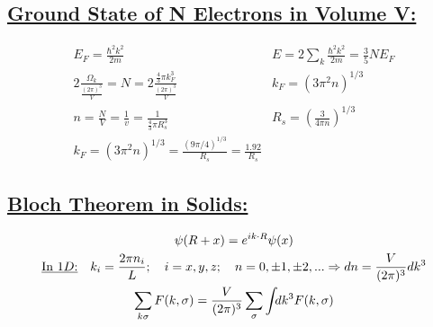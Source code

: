 \documentclass[a4paper,12pt]{article}
\begin{document}
\subsection*{\underline{Ground State of N Electrons in Volume V:}}

\begin{align}
&E_F=\frac{\hbar^2k^2}{2m}
&E=2\sum_k\frac{\hbar^2k^2}{2m}=\frac{3}{5}NE_F
&\\
&2\frac{\Omega_k}{\frac{(2\pi)^3}{V}}=N=2\frac{\frac{4}{3}\pi k_F^3}{\frac{(2\pi)^3}{V}}
& k_F = (3\pi^2n)^{1/3}
&\\
&n=\frac{N}{V}=\frac{1}{v}=\frac{1}{\frac{4}{3}\pi R_s^3}
&R_s=\left(\frac{3}{4\pi n}\right)^{1/3}
&\\
& k_F = (3\pi^2n)^{1/3} = \frac{(9\pi /4)^{1/3}}{R_s}=\frac{1.92}{R_s}
\end{align}
\subsection*{\underline{Bloch Theorem in Solids:}}
\begin{gather}
\psi (R+x)=e^{i k\cdot R} \psi (x)\\
\text{\underline{In $1D$:}}\quad k_i = \frac{2\pi n_i}{L}; \quad i=x, y, z;\quad n=0, \pm1, \pm 2, ... \Rightarrow dn = \frac{V}{(2\pi)^3} dk^3\\
\sum_{k\sigma}F(k, \sigma)= \frac{V}{(2\pi)^3} \sum_\sigma \int_{}  d k^3 F(k, \sigma)
\end{gather}
\end{document}
